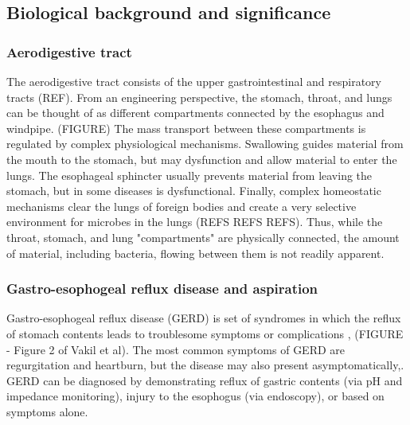 \documentclass[12pt]{article}
\begin{document}
\subsection{Biological background and significance}

\subsubsection{Aerodigestive tract}
The aerodigestive tract consists of the upper gastrointestinal and 
respiratory tracts (REF). From an engineering perspective, the 
stomach, throat, and lungs can be thought of as different compartments 
connected by the esophagus and windpipe. (FIGURE) The mass transport 
between these compartments is regulated by complex physiological 
mechanisms. Swallowing guides material from the mouth to the stomach, 
but may dysfunction and allow material to enter the lungs. The 
esophageal sphincter usually prevents material from leaving the 
stomach, but in some diseases is dysfunctional. Finally, complex 
homeostatic mechanisms clear the lungs of foreign bodies and create a 
very selective environment for microbes in the lungs (REFS REFS REFS). 
Thus, while the throat, stomach, and lung "compartments" are 
physically connected, the amount of material, including bacteria, 
flowing between them is not readily apparent. 

\subsubsection{Gastro-esophogeal reflux disease and aspiration}

Gastro-esophogeal reflux disease (GERD) is set of syndromes in which 
the reflux of stomach contents leads to troublesome symptoms or 
complications \cite{vakil-gerd_defn-2006},\cite{dent-gerd_epi-2005}
(FIGURE - Figure 2 of Vakil et al). The most common symptoms of GERD 
are regurgitation and heartburn, but the disease may also present 
asymptomatically\cite{vakil-gerd_defn-2006},\cite{dent-gerd_epi-2005}. 
GERD can be diagnosed by demonstrating reflux of gastric contents (via 
pH and impedance monitoring), injury to the esophogus (via endoscopy), 
or based on symptoms alone\cite{vakil-gerd_defn-2006}. 
\end{document}
